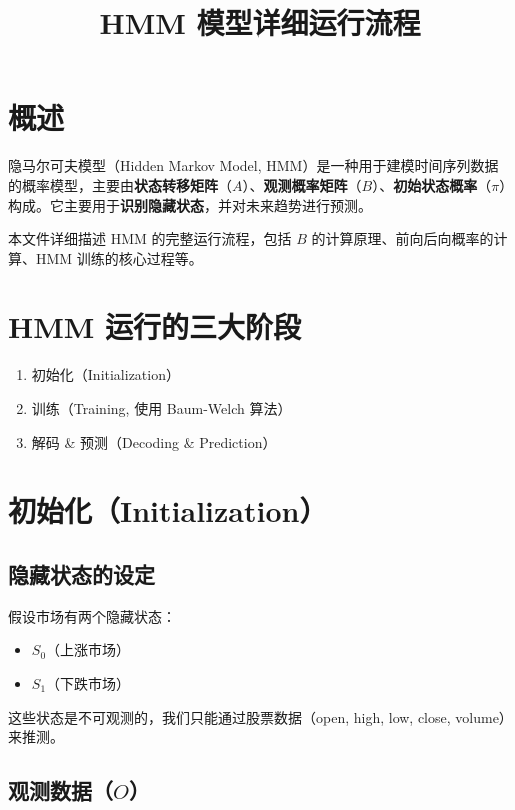 \documentclass{article}
\begin{document}
\title{HMM 模型详细运行流程}
\author{}
\date{}
\maketitle

\section{概述}

隐马尔可夫模型（Hidden Markov Model, HMM）是一种用于建模时间序列数据的概率模型，主要由\textbf{状态转移矩阵}（$A$）、\textbf{观测概率矩阵}（$B$）、\textbf{初始状态概率}（$\pi$）构成。它主要用于\textbf{识别隐藏状态}，并对未来趋势进行预测。

本文件详细描述 HMM 的完整运行流程，包括 $B$ 的计算原理、前向后向概率的计算、HMM 训练的核心过程等。

\section{HMM 运行的三大阶段}

\begin{enumerate}
    \item 初始化（Initialization）
    \item 训练（Training, 使用 Baum-Welch 算法）
    \item 解码 \& 预测（Decoding \& Prediction）
\end{enumerate}

\section{初始化（Initialization）}

\subsection{隐藏状态的设定}

假设市场有两个隐藏状态：
\begin{itemize}
    \item $S_0$（上涨市场）
    \item $S_1$（下跌市场）
\end{itemize}

这些状态是不可观测的，我们只能通过股票数据（open, high, low, close, volume）来推测。

\subsection{观测数据（$O$）}
\end{document}
